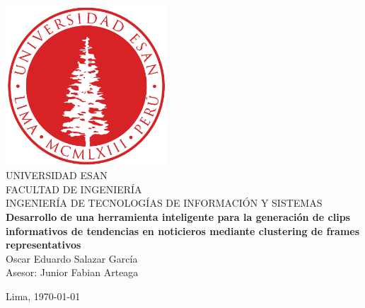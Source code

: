 \documentclass[12pt]{report}
\numberwithin{equation}{chapter} %
\begin{document}
\begin{titlepage}
	\begin{center}
	    \includegraphics[width=0.45\textwidth]{images_repo/esanlogomin}
		\vspace*{2cm} \\
		UNIVERSIDAD ESAN \vspace*{1ex} \\
		FACULTAD DE INGENIERÍA \vspace*{1ex} \\
		INGENIERÍA DE TECNOLOGÍAS DE INFORMACIÓN Y SISTEMAS\vspace*{8ex} \\
		\textbf{Desarrollo de una herramienta inteligente para la generación de clips informativos de tendencias en noticieros mediante clustering de frames representativos}
		\vspace*{8ex}\\	
		
		Oscar Eduardo Salazar García\\
		Asesor: Junior Fabian Arteaga		
		\vfill
		
		Lima, \today 
		
	\end{center}
\end{titlepage}

\renewcommand{\listfigurename}{Índice de Figuras}
\renewcommand{\tablename}{Tabla}
\renewcommand{\listtablename}{Índice de Tablas}

\tableofcontents %


\setcounter{secnumdepth}{3} %
\setcounter{tocdepth}{3}    %

\listoffigures %

\listoftables  %



%
%
%
%

\appendix
\renewcommand{\appendixname}{Anexos}
\renewcommand{\appendixtocname}{Anexos}
\renewcommand{\appendixpagename}{Anexos}
\clearpage
\addappheadtotoc
\appendixpage


\printbibliography[heading=bibintoc,title={BIBLIOGRAFÍA}]
\end{document}

